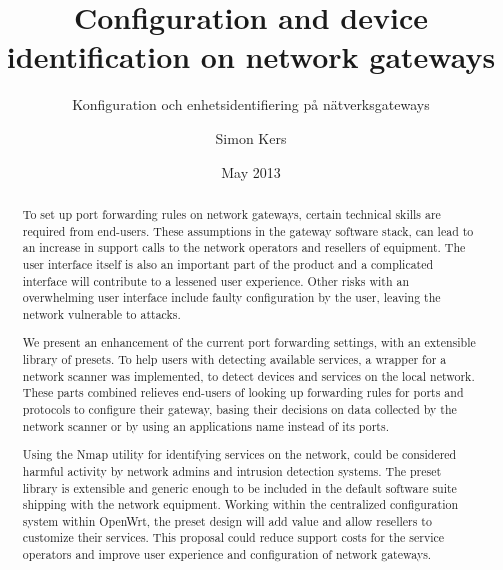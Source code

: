 \documentclass[a4paper,11pt]{kth-bcs}
\title{Configuration and device identification on network gateways}
\subtitle{Konfiguration och enhetsidentifiering på nätverksgateways}
\author{Simon Kers}
\date{May 2013}
\newcommand\blankpage{%
    \null
    \thispagestyle{empty}%
    \addtocounter{page}{-1}%
    \newpage}
\begin{document}
\frontmatter
{}
\setcounter{page}{1}
\pagestyle{center}

\maketitle
\thispagestyle{center}
\begin{abstract}
To set up port forwarding rules on network gateways, certain technical skills are required from end-users.
These assumptions in the gateway software stack, can lead to an increase in support calls to the network operators and resellers of equipment.
The user interface itself is also an important part of the product and a complicated interface will contribute to a lessened user experience.
Other risks with an overwhelming user interface include faulty configuration by the user, leaving the network vulnerable to attacks.


We present an enhancement of the current port forwarding settings, with an extensible library of presets.
To help users with detecting available services, a wrapper for a network scanner was implemented, to detect devices and services on the local network.
These parts combined relieves end-users of looking up forwarding rules for ports and protocols to configure their gateway, basing their decisions on data collected by the network scanner or by using an applications name instead of its ports.

Using the Nmap utility for identifying services on the network, could be considered harmful activity by network admins and intrusion detection systems.
The preset library is extensible and generic enough to be included in the default software suite shipping with the network equipment.
Working within the centralized configuration system within OpenWrt, the preset design will add value and allow resellers to customize their services.
This proposal could reduce support costs for the service operators and improve user experience and configuration of network gateways.

\end{abstract}
\newpage
\blankpage
\end{document}
